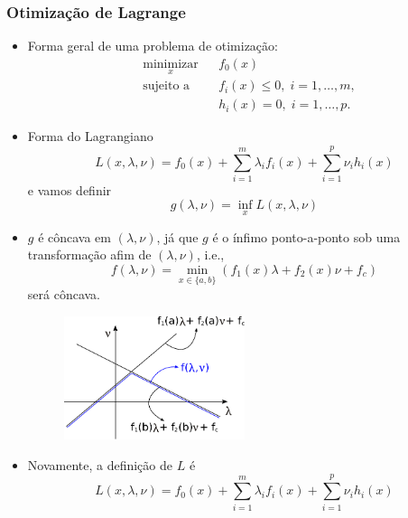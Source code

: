 \begin{frame}[allowframebreaks]
  \frametitle{Otimização de Lagrange}
  \begin{itemize}
  \item Forma geral de uma problema de otimização:
	\begin{equation}
	\begin{aligned}
	& \underset{x}{\text{minimizar}}
	& & f_0(x) \\
	& \text{sujeito a}
	& & f_i(x) \leq 0, \; i = 1, \ldots, m, \\
	& & & h_i(x) = 0, \; i = 1, \ldots, p.
	\end{aligned}
	\end{equation}

  \item Forma do Lagrangiano
	\begin{equation}
	L(x, \lambda, \nu) = f_0(x) + \sum_{i=1}^{m} \lambda_i f_i (x) + \sum_{i=1}^{p} \nu_i h_i (x)
	\end{equation}
	e vamos definir
	\begin{equation}
	g(\lambda, \nu) = \inf_{x} L(x, \lambda, \nu)
	\end{equation}

  \item $g$ é côncava em $(\lambda, \nu)$, já que $g$ é o ínfimo ponto-a-ponto sob uma transformação
	afim de $(\lambda, \nu)$, i.e.,
	\begin{equation}
	f(\lambda, \nu) = \min_{x \in \{a,b\}} (f_1(x) \lambda + f_2 (x) \nu + f_c)
        \end{equation}
	será côncava.

        \begin{figure}[h!]
        \centering
        \includegraphics[width=0.5\textwidth]{images/fnulambda.pdf}
        \label{fig:fnulambda}
        \end{figure}

  \item Novamente, a definição de $L$ é
        \begin{equation}
        L(x, \lambda, \nu) = f_0(x) + \sum_{i=1}^{m} \lambda_i f_i (x) + \sum_{i=1}^{p} \nu_i h_i (x)
        \end{equation}


\end{itemize}
\end{frame}
